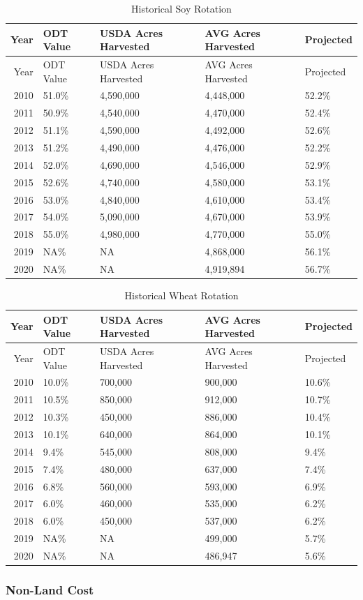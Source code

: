 \documentclass[]{article}
\begin{document}
\begin{longtable}[]{@{}rllll@{}}
\caption{Historical Soy Rotation}\tabularnewline
\toprule
Year & ODT Value & USDA Acres Harvested & AVG Acres Harvested &
Projected\tabularnewline
\midrule
\endfirsthead
\toprule
Year & ODT Value & USDA Acres Harvested & AVG Acres Harvested &
Projected\tabularnewline
\midrule
\endhead
2010 & 51.0\% & 4,590,000 & 4,448,000 & 52.2\%\tabularnewline
2011 & 50.9\% & 4,540,000 & 4,470,000 & 52.4\%\tabularnewline
2012 & 51.1\% & 4,590,000 & 4,492,000 & 52.6\%\tabularnewline
2013 & 51.2\% & 4,490,000 & 4,476,000 & 52.2\%\tabularnewline
2014 & 52.0\% & 4,690,000 & 4,546,000 & 52.9\%\tabularnewline
2015 & 52.6\% & 4,740,000 & 4,580,000 & 53.1\%\tabularnewline
2016 & 53.0\% & 4,840,000 & 4,610,000 & 53.4\%\tabularnewline
2017 & 54.0\% & 5,090,000 & 4,670,000 & 53.9\%\tabularnewline
2018 & 55.0\% & 4,980,000 & 4,770,000 & 55.0\%\tabularnewline
2019 & NA\% & NA & 4,868,000 & 56.1\%\tabularnewline
2020 & NA\% & NA & 4,919,894 & 56.7\%\tabularnewline
\bottomrule
\end{longtable}

\begin{longtable}[]{@{}rllll@{}}
\caption{Historical Wheat Rotation}\tabularnewline
\toprule
Year & ODT Value & USDA Acres Harvested & AVG Acres Harvested &
Projected\tabularnewline
\midrule
\endfirsthead
\toprule
Year & ODT Value & USDA Acres Harvested & AVG Acres Harvested &
Projected\tabularnewline
\midrule
\endhead
2010 & 10.0\% & 700,000 & 900,000 & 10.6\%\tabularnewline
2011 & 10.5\% & 850,000 & 912,000 & 10.7\%\tabularnewline
2012 & 10.3\% & 450,000 & 886,000 & 10.4\%\tabularnewline
2013 & 10.1\% & 640,000 & 864,000 & 10.1\%\tabularnewline
2014 & 9.4\% & 545,000 & 808,000 & 9.4\%\tabularnewline
2015 & 7.4\% & 480,000 & 637,000 & 7.4\%\tabularnewline
2016 & 6.8\% & 560,000 & 593,000 & 6.9\%\tabularnewline
2017 & 6.0\% & 460,000 & 535,000 & 6.2\%\tabularnewline
2018 & 6.0\% & 450,000 & 537,000 & 6.2\%\tabularnewline
2019 & NA\% & NA & 499,000 & 5.7\%\tabularnewline
2020 & NA\% & NA & 486,947 & 5.6\%\tabularnewline
\bottomrule
\end{longtable}

\hypertarget{non-land-cost}{%
\subsubsection{Non-Land Cost}\label{non-land-cost}}
\end{document}
